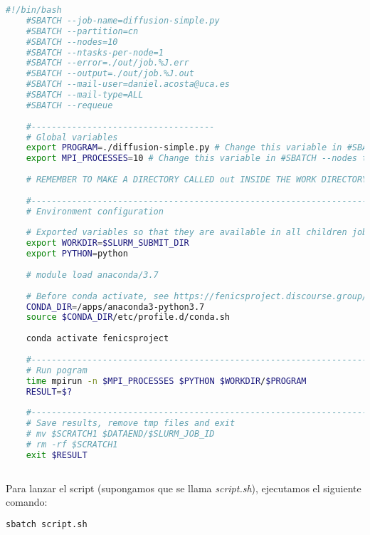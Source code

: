 \begin{lstlisting}[language=sh]
	#!/bin/bash
	#SBATCH --job-name=diffusion-simple.py
	#SBATCH --partition=cn
	#SBATCH --nodes=10
	#SBATCH --ntasks-per-node=1
	#SBATCH --error=./out/job.%J.err
	#SBATCH --output=./out/job.%J.out
	#SBATCH --mail-user=daniel.acosta@uca.es
	#SBATCH --mail-type=ALL
	#SBATCH --requeue
	
	#------------------------------------
	# Global variables
	export PROGRAM=./diffusion-simple.py # Change this variable in #SBATCH --job-name too
	export MPI_PROCESSES=10 # Change this variable in #SBATCH --nodes too
	
	# REMEMBER TO MAKE A DIRECTORY CALLED out INSIDE THE WORK DIRECTORY TO SAVE THE OUTPUTS
	
	#------------------------------------------------------------------
	# Environment configuration
	
	# Exported variables so that they are available in all children jobs
	export WORKDIR=$SLURM_SUBMIT_DIR
	export PYTHON=python
	
	# module load anaconda/3.7
	
	# Before conda activate, see https://fenicsproject.discourse.group/t/fenics-from-conda-doesnt-import/3502/6
	CONDA_DIR=/apps/anaconda3-python3.7
	source $CONDA_DIR/etc/profile.d/conda.sh
	
	conda activate fenicsproject
	
	#------------------------------------------------------------------
	# Run pogram
	time mpirun -n $MPI_PROCESSES $PYTHON $WORKDIR/$PROGRAM
	RESULT=$?
	
	#------------------------------------------------------------------
	# Save results, remove tmp files and exit
	# mv $SCRATCH1 $DATAEND/$SLURM_JOB_ID
	# rm -rf $SCRATCH1
	exit $RESULT
	
\end{lstlisting}

Para lanzar el script (supongamos que se llama \textit{script.sh}), ejecutamos el siguiente comando:
\begin{lstlisting}[language=sh]
	sbatch script.sh
\end{lstlisting}

